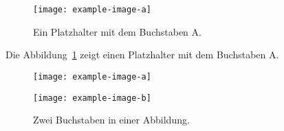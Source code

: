 \documentclass{article}
\begin{document}
\begin{figure}
  \centering
  \texttt{[image: example-image-a]}
  \caption{Ein Platzhalter mit dem Buchstaben A.}
  \label{fig:img-a}
\end{figure}

Die Abbildung~\ref{fig:img-a} zeigt einen Platzhalter mit dem Buchstaben A.
\lipsum[1]

\begin{figure}
  \begin{minipage}{\linewidth}
    \begin{minipage}{0.5\linewidth}
      \centering
      \texttt{[image: example-image-a]}
    \end{minipage}%
    \begin{minipage}{0.5\linewidth}
      \centering
      \texttt{[image: example-image-b]}
    \end{minipage}
    \caption{Zwei Buchstaben in einer Abbildung.}
  \end{minipage}
\end{figure}

\lipsum[3-5]
\end{document}
